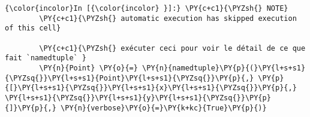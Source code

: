     \begin{Verbatim}[commandchars=\\\{\}]
{\color{incolor}In [{\color{incolor} }]:} \PY{c+c1}{\PYZsh{} NOTE}
        \PY{c+c1}{\PYZsh{} automatic execution has skipped execution of this cell}
        
        \PY{c+c1}{\PYZsh{} exécuter ceci pour voir le détail de ce que fait `namedtuple` }
        \PY{n}{Point} \PY{o}{=} \PY{n}{namedtuple}\PY{p}{(}\PY{l+s+s1}{\PYZsq{}}\PY{l+s+s1}{Point}\PY{l+s+s1}{\PYZsq{}}\PY{p}{,} \PY{p}{[}\PY{l+s+s1}{\PYZsq{}}\PY{l+s+s1}{x}\PY{l+s+s1}{\PYZsq{}}\PY{p}{,} \PY{l+s+s1}{\PYZsq{}}\PY{l+s+s1}{y}\PY{l+s+s1}{\PYZsq{}}\PY{p}{]}\PY{p}{,} \PY{n}{verbose}\PY{o}{=}\PY{k+kc}{True}\PY{p}{)}
\end{Verbatim}



    
    
    
